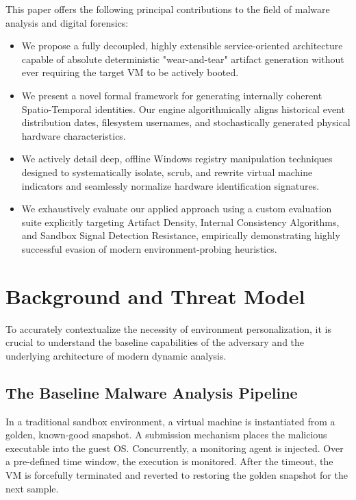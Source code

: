\documentclass{ieeeaccess}
\begin{document}
This paper offers the following principal contributions to the field of malware analysis and digital forensics:
\begin{itemize}
\item We propose a fully decoupled, highly extensible service-oriented architecture capable of absolute deterministic "wear-and-tear" artifact generation without ever requiring the target VM to be actively booted.
\item We present a novel formal framework for generating internally coherent Spatio-Temporal identities. Our engine algorithmically aligns historical event distribution dates, filesystem usernames, and stochastically generated physical hardware characteristics.
\item We actively detail deep, offline Windows registry manipulation techniques designed to systematically isolate, scrub, and rewrite virtual machine indicators and seamlessly normalize hardware identification signatures.
\item We exhaustively evaluate our applied approach using a custom evaluation suite explicitly targeting Artifact Density, Internal Consistency Algorithms, and Sandbox Signal Detection Resistance, empirically demonstrating highly successful evasion of modern environment-probing heuristics.
\end{itemize}

\section{Background and Threat Model}

To accurately contextualize the necessity of environment personalization, it is crucial to understand the baseline capabilities of the adversary and the underlying architecture of modern dynamic analysis.

\subsection{The Baseline Malware Analysis Pipeline}
In a traditional sandbox environment, a virtual machine is instantiated from a golden, known-good snapshot. A submission mechanism places the malicious executable into the guest OS. Concurrently, a monitoring agent is injected. Over a pre-defined time window, the execution is monitored. After the timeout, the VM is forcefully terminated and reverted to restoring the golden snapshot for the next sample.
\end{document}
